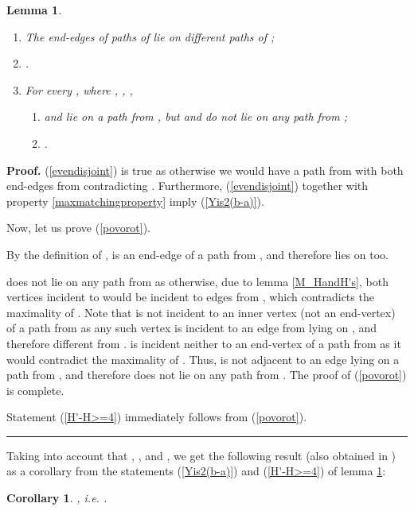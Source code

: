 \documentclass[a4paper, 12pt]{article}
\newtheorem{lemmasection}[definition]{Lemma}
\newtheorem{corollarysection}[definition]{Corollary}
\newenvironment{proof}[1][Proof]{\noindent\textbf{#1.} }{\ \rule{0.5em}{0.5em}}
\begin{document}
\begin{lemmasection}\label{Y_stuff}\
\begin{enumerate}
\renewcommand{\labelenumi}{(\arabic{enumi})}
\item \label{evendisjoint} The end-edges of paths of 
lie on different paths of ;
\item \label{Yis2(b-a)} .
\item For every , where , , ,
\begin{enumerate}
\renewcommand{\labelenumii}{(\alph{enumii})}
\item \label{povorot}
 and  lie on a path from , but  and
 do not lie on any path from ;
\item \label{H'-H>=4} .
\end{enumerate}
\end{enumerate}
\end{lemmasection}
\begin{proof}
(\ref{evendisjoint}) is true as otherwise we would have a path from
 with both end-edges from  contradicting . Furthermore, (\ref{evendisjoint}) together
with property \ref{maxmatchingproperty} imply (\ref{Yis2(b-a)}).

Now, let us prove (\ref{povorot}).

By the definition of ,  is an end-edge of a path
 from , and therefore  lies on  too.

 does not lie on any path from  as otherwise, due
to lemma \ref{M_HandH's}, both vertices incident to  would be
incident to edges from , which contradicts the maximality of
. Note that  is not incident to an inner vertex (not an
end-vertex) of a path  from  as any such vertex is
incident to an edge from  lying on , and therefore different
from .  is incident neither to an end-vertex of a path
 from  as it would contradict the maximality of
. Thus,  is not adjacent to an edge lying on a path from
, and therefore  does not lie on any path from
. The proof of (\ref{povorot}) is complete.

Statement (\ref{H'-H>=4}) immediately follows from (\ref{povorot}).
\end{proof}

Taking into account that , , and , we get the following result (also
obtained in \cite{VAV}) as a corollary from the statements
(\ref{Yis2(b-a)}) and (\ref{H'-H>=4}) of lemma \ref{Y_stuff}:

\begin{corollarysection}\label{fivefourthinequality}
, i.e. .
\end{corollarysection}
\end{document}
